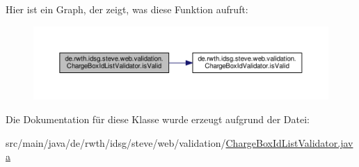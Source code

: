 Hier ist ein Graph, der zeigt, was diese Funktion aufruft\+:\nopagebreak
\begin{figure}[H]
\begin{center}
\leavevmode
\includegraphics[width=350pt]{classde_1_1rwth_1_1idsg_1_1steve_1_1web_1_1validation_1_1_charge_box_id_list_validator_a121f0004fceaeb1a11e2a5033c48778e_cgraph}
\end{center}
\end{figure}




Die Dokumentation für diese Klasse wurde erzeugt aufgrund der Datei\+:\begin{DoxyCompactItemize}
\item 
src/main/java/de/rwth/idsg/steve/web/validation/\hyperlink{_charge_box_id_list_validator_8java}{Charge\+Box\+Id\+List\+Validator.\+java}\end{DoxyCompactItemize}
